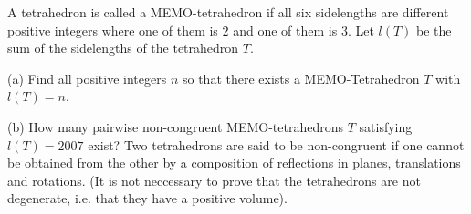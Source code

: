 A tetrahedron is called a MEMO-tetrahedron if all six sidelengths are different positive integers where one of them is $ 2$ and one of them is $ 3$. Let $ l(T)$ be the sum of the sidelengths of the tetrahedron $ T$.

(a) Find all positive integers $ n$ so that there exists a MEMO-Tetrahedron $ T$ with $ l(T)=n$.

(b) How many pairwise non-congruent MEMO-tetrahedrons $ T$ satisfying $ l(T)=2007$ exist? Two tetrahedrons are said to be non-congruent if one cannot be obtained from the other by a composition of reflections in planes, translations and rotations. (It is not neccessary to prove that the tetrahedrons are not degenerate, i.e. that they have a positive volume).